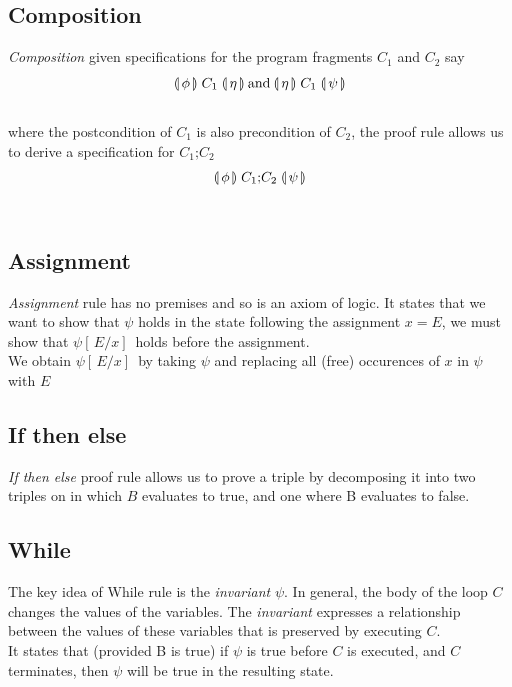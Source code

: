\documentclass{article}
\newcommand\Hoaretriple[3]{%
  \llparenthesis\,#1\,\rrparenthesis
  \mathrel{#2}\nolinebreak 
  \llparenthesis\,#3\,\rrparenthesis
}
\begin{document}
\subsection{Composition}
\begin{flushleft}
\textit{Composition} given specifications for the program fragments $C_{1}$ and $C_{2}$ say
\[ \Hoaretriple{\phi}{ C_{1} }{\eta} \: \text{and} \: \Hoaretriple{\eta}{ C_{1} }{\psi} \]\\
where the postcondition of $C_{1}$ is also precondition of $C_{2}$, the proof rule allows us to derive a specification for $C_{1}\text{;}C_{2}$
\[\Hoaretriple{\phi}{ C_{1}\text{;}C_{2} }{\psi} \]\\
\end{flushleft}

\subsection{Assignment}
\begin{flushleft}
\textit{Assignment} rule has no premises and so is an axiom of logic. It states that we want to show that $\psi$ holds in the state following the assignment
$x = E$, we must show that $\psi[ \, E/x ] \,$ holds before the assignment.\\
We obtain $\psi[ \, E/x ] \,$  by taking $\psi$ and replacing all (free) occurences of $x$ in $\psi$ with $E$
\end{flushleft}

\subsection{If then else}
\begin{flushleft}
\textit{If then else} proof rule allows us to prove a triple by decomposing it into two triples on in which $B$ evaluates to true, and one where B evaluates to false.
\end{flushleft}

\pagebreak
\subsection{While}
\begin{flushleft}
The key idea of While rule is the \textit{invariant} $\psi$. In general, the body of the loop $C$ changes the values of the variables. The \textit{invariant} expresses a relationship between the values of these variables that is preserved by executing $C$.\\
It states that (provided B is true) if $\psi$ is true before $C$ is executed, and $C$ terminates, then $\psi$ will be true in the resulting state.
\end{flushleft}
\end{document}
